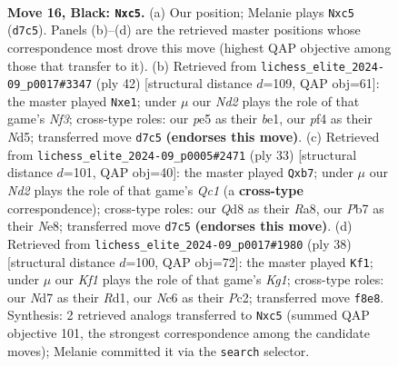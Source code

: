 \documentclass[11pt]{article}
\begin{document}
\clearpage

\begin{figure}[p]\centering
\begin{subfigure}{0.46\textwidth}\centering
\resizebox{\linewidth}{!}{%
\newchessgame
\chessboard[
  setfen={r1bq1k2/pp1n1pp1/2n1p3/2BpP3/Q4P1r/P7/1P4PP/R3KNNR b KQ - 0 16},
  showmover=false,
  pgfstyle=straightmove, color=movearrow, markmove={d7-c5}
]}
\caption{}
\end{subfigure}\hfill
\begin{subfigure}{0.46\textwidth}\centering
\resizebox{\linewidth}{!}{%
\newchessgame
\chessboard[
  setfen={r3k2r/3p1ppp/bpq3n1/3NPp2/2P2B2/P2Q1N1P/5PP1/2R1b1K1 w kq - 0 22},
  showmover=false,
  pgfstyle=straightmove, color=movearrow, markmove={f3-e1}
]}
\caption{}
\end{subfigure}
\\[4pt]
\begin{subfigure}{0.46\textwidth}\centering
\resizebox{\linewidth}{!}{%
\newchessgame
\chessboard[
  setfen={r1q1n1k1/1Bp3bp/1p2p1p1/p1n2rN1/2Q5/2P3P1/PP1N1P1P/R1BR2K1 b - - 0 17},
  showmover=false,
  pgfstyle=straightmove, color=movearrow, markmove={c8-b7}
]}
\caption{}
\end{subfigure}\hfill
\begin{subfigure}{0.46\textwidth}\centering
\resizebox{\linewidth}{!}{%
\newchessgame
\chessboard[
  setfen={r3n1rk/3b1p1p/p2pp2R/1pq5/4P2Q/1BN5/PPP3PP/3R2K1 w - - 3 20},
  showmover=false,
  pgfstyle=straightmove, color=movearrow, markmove={g1-f1}
]}
\caption{}
\end{subfigure}
\caption{\textbf{Move 16, Black: \texttt{Nxc5}.} (a) Our position; Melanie plays \texttt{Nxc5} (\texttt{d7c5}). Panels (b)--(d) are the retrieved master positions whose correspondence most drove this move (highest QAP objective among those that transfer to it). (b) Retrieved from \texttt{lichess\_elite\_2024-09\_p0017\#3347} (ply 42) [structural distance $d$=109, QAP obj=61]: the master played \texttt{Nxe1}; under $\mu$ our \emph{Nd2} plays the role of that game's \emph{Nf3}; cross-type roles: our \emph{p}e5 as their \emph{b}e1, our \emph{p}f4 as their \emph{N}d5; transferred move \texttt{d7c5} \textbf{(endorses this move)}. (c) Retrieved from \texttt{lichess\_elite\_2024-09\_p0005\#2471} (ply 33) [structural distance $d$=101, QAP obj=40]: the master played \texttt{Qxb7}; under $\mu$ our \emph{Nd2} plays the role of that game's \emph{Qc1} (a \textbf{cross-type} correspondence); cross-type roles: our \emph{Q}d8 as their \emph{R}a8, our \emph{P}b7 as their \emph{N}e8; transferred move \texttt{d7c5} \textbf{(endorses this move)}. (d) Retrieved from \texttt{lichess\_elite\_2024-09\_p0017\#1980} (ply 38) [structural distance $d$=100, QAP obj=72]: the master played \texttt{Kf1}; under $\mu$ our \emph{Kf1} plays the role of that game's \emph{Kg1}; cross-type roles: our \emph{N}d7 as their \emph{R}d1, our \emph{N}c6 as their \emph{P}c2; transferred move \texttt{f8e8}. Synthesis: 2 retrieved analogs transferred to \texttt{Nxc5} (summed QAP objective 101, the strongest correspondence among the candidate moves); Melanie committed it via the \texttt{search} selector.}
\label{fig:thought-m31}
\end{figure}
\end{document}
